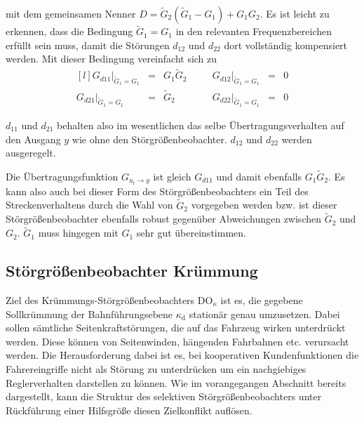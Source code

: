 mit dem gemeinsamen Nenner $D=\tilde G_2(\tilde G_1 - G_1)+G_1 G_2$.
Es ist leicht zu erkennen, dass die Bedingung $\tilde G_1=G_1$ in den relevanten Frequenzbereichen erfüllt sein muss, damit die Störungen $d_{12}$ und $d_{22}$ dort vollständig kompensiert werden. Mit dieser Bedingung vereinfacht sich  zu
\begin{equation}
\begin{matrix*}[l]
G_{d11}\bigr\rvert_{\tilde G_1 = G_1}&=&G_1 \tilde G_2 & \hspace{12pt} &
G_{d12}\bigr\rvert_{\tilde G_1 = G_1}&=&0\\
G_{d21}\bigr\rvert_{\tilde G_1 = G_1}&=&\tilde G_2 & \hspace{12pt} &
G_{d22}\bigr\rvert_{\tilde G_1 = G_1}&=&0
\end{matrix*}
\label{eq:DoSel02}
\end{equation}

$d_{11}$ und $d_{21}$ behalten also im wesentlichen das selbe Übertragungsverhalten auf den Ausgang $y$ wie ohne den Störgrößenbeobachter. $d_{12}$ und $d_{22}$ werden ausgeregelt.
 
Die Übertragungsfunktion $G_{u_\mathrm{r}\rightarrow y}$ ist gleich $G_{d11}$ und damit ebenfalls $G_1\tilde G_2$. Es kann also auch bei dieser Form des Störgrößenbeobachters ein Teil des Streckenverhaltens durch die Wahl von $\tilde G_2$ vorgegeben werden bzw. ist dieser Störgrößenbeobachter ebenfalls robust gegenüber Abweichungen zwischen $\tilde G_2$ und $G_2$.
$\tilde G_1$ muss hingegen mit $G_1$ sehr gut übereinstimmen.




\subsection{Störgrößenbeobachter Krümmung}\label{subS:DO_Kappa}
Ziel des Krümmungs-Störgrößenbeobachters $\mathrm{DO}_\kappa$ ist es, die gegebene Sollkrümmung der Bahnführungsebene $\kappa_\mathrm{d}$ stationär genau umzusetzen.  Dabei sollen sämtliche Seitenkraftstörungen, die auf das Fahrzeug wirken unterdrückt werden.  Diese können von Seitenwinden,  hängenden Fahrbahnen etc. verursacht werden.  Die Herausforderung dabei ist es, bei kooperativen Kundenfunktionen die Fahrereingriffe nicht als Störung zu unterdrücken um ein nachgiebiges Reglerverhalten darstellen zu können.  Wie im vorangegangen Abschnitt bereits dargestellt, kann die Struktur des selektiven Störgrößenbeobachters unter Rückführung einer Hilfsgröße diesen Zielkonflikt auflösen.  

